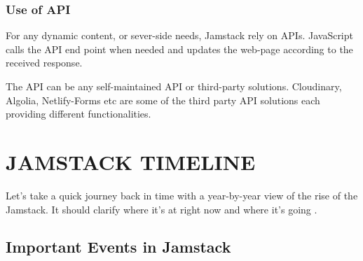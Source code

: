 \documentclass[12pt,a4paper,oneside]{report}
\begin{document}
\subsection{Use of API}
\par 
For any dynamic content, or sever-side needs, Jamstack rely on APIs. JavaScript calls the API end point when needed and updates the web-page according to the received response.
\par 
The API can be any self-maintained API or third-party solutions. Cloudinary, Algolia, Netlify-Forms etc are some of the third party API solutions each providing different functionalities.




\chapter{JAMSTACK TIMELINE}
Let’s take a quick journey back in time with a year-by-year view of the rise of the Jamstack. It should clarify where it’s at right now and where it’s going \cite{snip}.

\section{Important Events in Jamstack}
\end{document}
